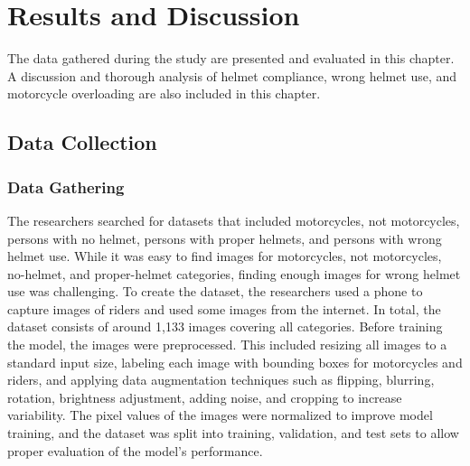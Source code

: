 
\chapter{Results and Discussion}

The data gathered during the study are presented and evaluated in this chapter. A discussion and thorough analysis of helmet compliance, wrong helmet use, and motorcycle overloading are also included in this chapter.
\begin{refsection}

\section{Data Collection}
\subsection{Data Gathering}
The researchers searched for datasets that included motorcycles, not motorcycles, persons with no helmet, persons with proper helmets, and persons with wrong helmet use. While it was easy to find images for motorcycles, not motorcycles, no-helmet, and proper-helmet categories, finding enough images for wrong helmet use was challenging. To create the dataset, the researchers used a phone to capture images of riders and used some images from the internet. In total, the dataset consists of around 1,133 images covering all categories. Before training the model, the images were preprocessed. This included resizing all images to a standard input size, labeling each image with bounding boxes for motorcycles and riders, and applying data augmentation techniques such as flipping, blurring, rotation, brightness adjustment, adding noise, and cropping to increase variability. The pixel values of the images were normalized to improve model training, and the dataset was split into training, validation, and test sets to allow proper evaluation of the model’s performance.


\end{refsection}
